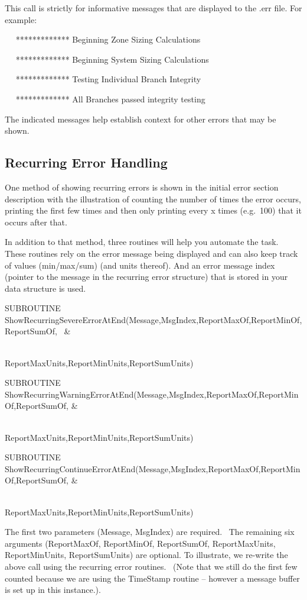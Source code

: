 This call is strictly for informative messages that are displayed to the .err file. For example:

~~ ************* Beginning Zone Sizing Calculations

~~ ************* Beginning System Sizing Calculations

~~ ************* Testing Individual Branch Integrity

~~ ************* All Branches passed integrity testing

The indicated messages help establish context for other errors that may be shown.

\subsection{Recurring Error Handling}\label{recurring-error-handling}

One method of showing recurring errors is shown in the initial error section description with the illustration of counting the number of times the error occurs, printing the first few times and then only printing every x times (e.g.~100) that it occurs after that.

In addition to that method, three routines will help you automate the task.~ These routines rely on the error message being displayed and can also keep track of values (min/max/sum) (and units thereof). And an error message index (pointer to the message in the recurring error structure) that is stored in your data structure is used.

SUBROUTINE ShowRecurringSevereErrorAtEnd(Message,MsgIndex,ReportMaxOf,ReportMinOf,ReportSumOf,~ \&

~~~~~~~~~~~~~~~~~~~~~~~~~~~~~~~~~~~~~~~~~~ ReportMaxUnits,ReportMinUnits,ReportSumUnits)

SUBROUTINE ShowRecurringWarningErrorAtEnd(Message,MsgIndex,ReportMaxOf,ReportMinOf,ReportSumOf, \&

~~~~~~~~~~~~~~~~~~~~~~~~~~~~~~~~~~~~~~~~~~ ReportMaxUnits,ReportMinUnits,ReportSumUnits)

SUBROUTINE ShowRecurringContinueErrorAtEnd(Message,MsgIndex,ReportMaxOf,ReportMinOf,ReportSumOf, \&

~~~~~~~~~~~~~~~~~~~~~~~~~~~~~~~~~~~~~~~~~~ ReportMaxUnits,ReportMinUnits,ReportSumUnits)

The first two parameters (Message, MsgIndex) are required.~ The remaining six arguments (ReportMaxOf, ReportMinOf, ReportSumOf, ReportMaxUnits, ReportMinUnits, ReportSumUnits) are optional. To illustrate, we re-write the above call using the recurring error routines.~ (Note that we still do the first few counted because we are using the TimeStamp routine -- however a message buffer is set up in this instance.).

